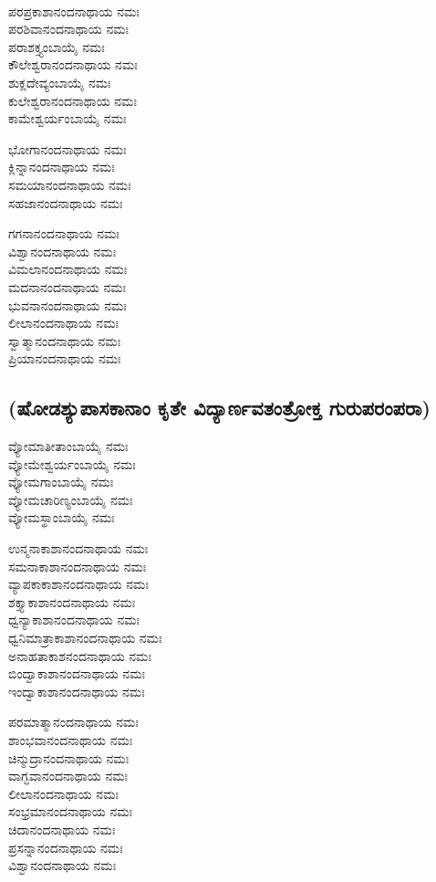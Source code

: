 \\
 ಪರಪ್ರಕಾಶಾನಂದನಾಥಾಯ ನಮಃ\\
 ಪರಶಿವಾನಂದನಾಥಾಯ ನಮಃ\\
 ಪರಾಶಕ್ತ್ಯಂಬಾಯೈ ನಮಃ\\
 ಕೌಲೇಶ್ವರಾನಂದನಾಥಾಯ ನಮಃ\\
 ಶುಕ್ಲದೇವ್ಯಂಬಾಯೈ ನಮಃ\\
 ಕುಲೇಶ್ವರಾನಂದನಾಥಾಯ ನಮಃ\\
 ಕಾಮೇಶ್ವರ್ಯಂಬಾಯೈ ನಮಃ

 ಭೋಗಾನಂದನಾಥಾಯ ನಮಃ\\
 ಕ್ಲಿನ್ನಾನಂದನಾಥಾಯ ನಮಃ\\
 ಸಮಯಾನಂದನಾಥಾಯ ನಮಃ\\
 ಸಹಜಾನಂದನಾಥಾಯ ನಮಃ

 ಗಗನಾನಂದನಾಥಾಯ ನಮಃ\\
 ವಿಶ್ವಾನಂದನಾಥಾಯ ನಮಃ\\
 ವಿಮಲಾನಂದನಾಥಾಯ ನಮಃ\\
 ಮದನಾನಂದನಾಥಾಯ ನಮಃ\\
 ಭುವನಾನಂದನಾಥಾಯ ನಮಃ\\
 ಲೀಲಾನಂದನಾಥಾಯ ನಮಃ\\
 ಸ್ವಾತ್ಮಾನಂದನಾಥಾಯ ನಮಃ\\
 ಪ್ರಿಯಾನಂದನಾಥಾಯ ನಮಃ
\subsection{(ಷೋಡಶ್ಯುಪಾಸಕಾನಾಂ ಕೃತೇ ವಿದ್ಯಾರ್ಣವತಂತ್ರೋಕ್ತ ಗುರುಪರಂಪರಾ)}
 ವ್ಯೋಮಾತೀತಾಂಬಾಯೈ ನಮಃ\\
 ವ್ಯೋಮೇಶ್ವರ್ಯಂಬಾಯೈ ನಮಃ\\
 ವ್ಯೋಮಗಾಂಬಾಯೈ ನಮಃ\\
 ವ್ಯೋಮಚಾರಿಣ್ಯಂಬಾಯೈ ನಮಃ\\
 ವ್ಯೋಮಸ್ಥಾಂಬಾಯೈ ನಮಃ

 ಉನ್ಮನಾಕಾಶಾನಂದನಾಥಾಯ ನಮಃ\\
 ಸಮನಾಕಾಶಾನಂದನಾಥಾಯ ನಮಃ\\
 ವ್ಯಾಪಕಾಕಾಶಾನಂದನಾಥಾಯ ನಮಃ\\
 ಶಕ್ತ್ಯಾಕಾಶಾನಂದನಾಥಾಯ ನಮಃ\\
 ಧ್ವನ್ಯಾಕಾಶಾನಂದನಾಥಾಯ ನಮಃ\\
 ಧ್ವನಿಮಾತ್ರಾಕಾಶಾನಂದನಾಥಾಯ ನಮಃ\\
 ಅನಾಹತಾಕಾಶನಂದನಾಥಾಯ ನಮಃ\\
 ಬಿಂದ್ವಾಕಾಶಾನಂದನಾಥಾಯ ನಮಃ\\
 ಇಂದ್ವಾಕಾಶಾನಂದನಾಥಾಯ ನಮಃ

 ಪರಮಾತ್ಮಾನಂದನಾಥಾಯ ನಮಃ\\
 ಶಾಂಭವಾನಂದನಾಥಾಯ ನಮಃ\\
 ಚಿನ್ಮುದ್ರಾನಂದನಾಥಾಯ ನಮಃ\\
 ವಾಗ್ಭವಾನಂದನಾಥಾಯ ನಮಃ\\
 ಲೀಲಾನಂದನಾಥಾಯ ನಮಃ\\
 ಸಂಭ್ರಮಾನಂದನಾಥಾಯ ನಮಃ\\
 ಚಿದಾನಂದನಾಥಾಯ ನಮಃ\\
 ಪ್ರಸನ್ನಾನಂದನಾಥಾಯ ನಮಃ\\
 ವಿಶ್ವಾನಂದನಾಥಾಯ ನಮಃ

